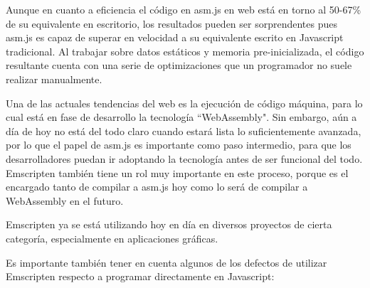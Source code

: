 Aunque en cuanto a eficiencia el código en asm.js en web está en torno al 50-67\% de su equivalente en escritorio, los resultados pueden ser sorprendentes pues asm.js es capaz de superar en velocidad a su equivalente escrito en Javascript tradicional. Al trabajar sobre datos estáticos y memoria pre-inicializada, el código resultante cuenta con una serie de optimizaciones que un programador no suele realizar manualmente.

Una de las actuales tendencias del web es la ejecución de código máquina, para lo cual está en fase de desarrollo la tecnología ``WebAssembly". Sin embargo, aún a día de hoy no está del todo claro cuando estará lista lo suficientemente avanzada, por lo que el papel de asm.js es importante como paso intermedio, para que los desarrolladores puedan ir adoptando la tecnología antes de ser funcional del todo. Emscripten también tiene un rol muy importante en este proceso, porque es el encargado tanto de compilar a asm.js hoy como lo será de compilar a WebAssembly en el futuro.

Emscripten ya se está utilizando hoy en día en diversos proyectos de cierta categoría, especialmente en aplicaciones gráficas.

Es importante también tener en cuenta algunos de los defectos de utilizar Emscripten respecto a programar directamente en Javascript:

